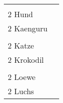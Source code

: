 \documentclass{article}\usepackage[ngerman]{babel}\usepackage{geometry}\usepackage{lmodern}
\begin{document}
\begin{table}[p]
  \begin{tabular}{ll}    \hspace{-2em}    \fbox{\begin{minipage}[t][6cm][t]{8cm}
        \fontsize{45}{54} \selectfont
        \phantom{ }\\
      \phantom{ }2 Hund    \end{minipage}}
    &
\fbox{\begin{minipage}[t][6cm][t]{8cm}
        \fontsize{45}{54} \selectfont
        \phantom{ }\\
        \phantom{ } 2 Kaenguru      \end{minipage}}\\    \hspace{-2em}    \fbox{\begin{minipage}[t][6cm][t]{8cm}
        \fontsize{45}{54} \selectfont
        \phantom{ }\\
      \phantom{ }2 Katze    \end{minipage}}
    &
\fbox{\begin{minipage}[t][6cm][t]{8cm}
        \fontsize{45}{54} \selectfont
        \phantom{ }\\
        \phantom{ } 2 Krokodil      \end{minipage}}\\    \hspace{-2em}    \fbox{\begin{minipage}[t][6cm][t]{8cm}
        \fontsize{45}{54} \selectfont
        \phantom{ }\\
      \phantom{ }2 Loewe    \end{minipage}}
    &
\fbox{\begin{minipage}[t][6cm][t]{8cm}
        \fontsize{45}{54} \selectfont
        \phantom{ }\\
        \phantom{ } 2 Luchs      \end{minipage}}\\\end{tabular}
\end{table}
\end{document}
